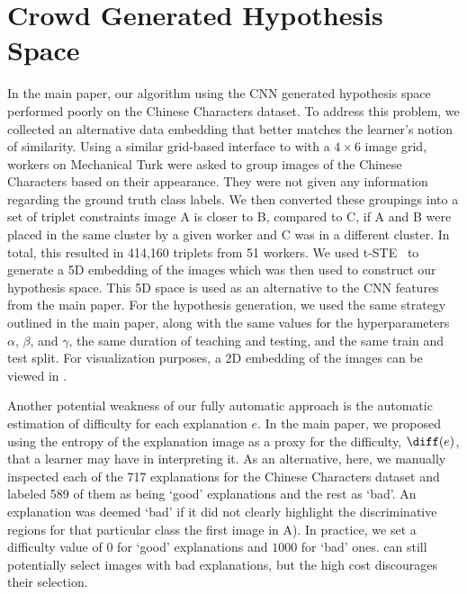 \documentclass[../main.tex]{subfiles}
\begin{document}
\onecolumn
{}
\section{Crowd Generated Hypothesis Space}
In the main paper, our \EXPLAIN algorithm using the CNN generated hypothesis space performed poorly on the Chinese Characters dataset.
To address this problem, we collected an alternative data embedding that better matches the learner's notion of similarity. 
Using a similar grid-based interface to \cite{gomes2011crowdclustering,kim2018context} with a $4\times6$ image grid, workers on Mechanical Turk were asked to group images of the Chinese Characters based on their appearance.
They were not given any information regarding the ground truth class labels. 
We then converted these groupings into a set of triplet constraints \ie image A is closer to B, compared to C, if A and B were placed in the same cluster by a given worker and C was in a different cluster.
In total, this resulted in 414,160 triplets from 51 workers. 
We used t-STE~\cite{van2012stochastic} to generate a 5D embedding of the images which was then used to construct our hypothesis space. 
This 5D space is used as an alternative to the CNN features from the main paper.
For the hypothesis generation, we used the same strategy outlined in the main paper, along with the same values for the hyperparameters $\alpha$, $\beta$, and $\gamma$, the same duration of teaching and testing, and the same train and test split.
For visualization purposes, a 2D embedding of the images can be viewed in .

Another potential weakness of our fully automatic approach is the automatic estimation of difficulty for each explanation $e$. 
In the main paper, we proposed using the entropy of the explanation image as a proxy for the difficulty, $\diff(e)$, that a learner may have in interpreting it.
As an alternative, here, we manually inspected each of the 717 explanations for the Chinese Characters dataset and labeled 589 of them as being `good' explanations and the rest as `bad'.
An explanation was deemed `bad' if it did not clearly highlight the discriminative regions for that particular class \eg the first image in  A).
In practice, we set a difficulty value of $0$ for `good' explanations and $1000$ for `bad' ones. 
\EXPLAIN can still potentially select images with bad explanations, but the high cost discourages their selection. 
\end{document}
